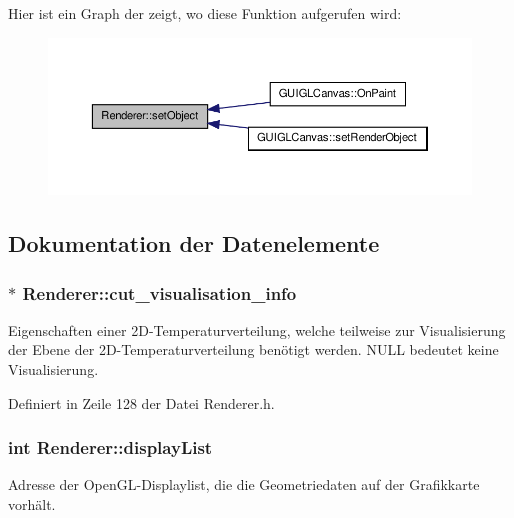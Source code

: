 Hier ist ein Graph der zeigt, wo diese Funktion aufgerufen wird\-:\nopagebreak
\begin{figure}[H]
\begin{center}
\leavevmode
\includegraphics[width=350pt]{classRenderer_a9db67fbbd309875b564ca1df08daf372_icgraph}
\end{center}
\end{figure}




\subsection{Dokumentation der Datenelemente}
\hypertarget{classRenderer_a119b7d1e3eb740a118e269758dd1a906}{
\subsubsection[{cut\-\_\-visualisation\-\_\-info}]{$\ast$ Renderer\-::cut\-\_\-visualisation\-\_\-info\hspace{0.3cm}{\ttfamily [private]}}}\label{classRenderer_a119b7d1e3eb740a118e269758dd1a906}
Eigenschaften einer 2\-D-\/\-Temperaturverteilung, welche teilweise zur Visualisierung der Ebene der 2\-D-\/\-Temperaturverteilung benötigt werden. N\-U\-L\-L bedeutet keine Visualisierung. 

Definiert in Zeile 128 der Datei Renderer.\-h.

\hypertarget{classRenderer_a165ec913fa058d0a38f5e7b7635adfd2}{
\subsubsection[{display\-List}]{\setlength{\rightskip}{0pt plus 5cm}int Renderer\-::display\-List\hspace{0.3cm}{\ttfamily [private]}}}\label{classRenderer_a165ec913fa058d0a38f5e7b7635adfd2}
Adresse der Open\-G\-L-\/\-Displaylist, die die Geometriedaten auf der Grafikkarte vorhält. 

